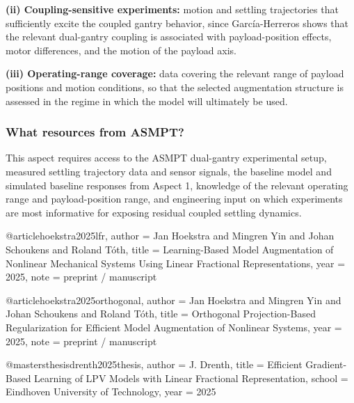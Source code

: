 \textbf{(ii) Coupling-sensitive experiments:} motion and settling trajectories that sufficiently excite the coupled gantry behavior, since García-Herreros shows that the relevant dual-gantry coupling is associated with payload-position effects, motor differences, and the motion of the payload axis.

\textbf{(iii) Operating-range coverage:} data covering the relevant range of payload positions and motion conditions, so that the selected augmentation structure is assessed in the regime in which the model will ultimately be used.

\subsubsection{What resources from ASMPT?}

This aspect requires access to the ASMPT dual-gantry experimental setup, measured settling trajectory data and sensor signals, the baseline model and simulated baseline responses from Aspect 1, knowledge of the relevant operating range and payload-position range, and engineering input on which experiments are most informative for exposing residual coupled settling dynamics.


@article{hoekstra2025lfr,
  author  = {Jan Hoekstra and Mingren Yin and Johan Schoukens and Roland T{\'o}th},
  title   = {Learning-Based Model Augmentation of Nonlinear Mechanical Systems Using Linear Fractional Representations},
  year    = {2025},
  note    = {preprint / manuscript}
}

@article{hoekstra2025orthogonal,
  author  = {Jan Hoekstra and Mingren Yin and Johan Schoukens and Roland T{\'o}th},
  title   = {Orthogonal Projection-Based Regularization for Efficient Model Augmentation of Nonlinear Systems},
  year    = {2025},
  note    = {preprint / manuscript}
}

@mastersthesis{drenth2025thesis,
  author = {J. Drenth},
  title  = {Efficient Gradient-Based Learning of LPV Models with Linear Fractional Representation},
  school = {Eindhoven University of Technology},
  year   = {2025}
}